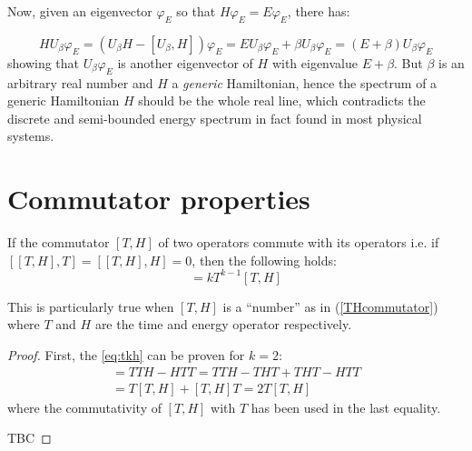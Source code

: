 \documentclass[a4paper,12pt]{article}
\begin{document}
Now, given an eigenvector $\varphi_{E}$ so that $H\varphi_{E}=E\varphi_{E}$, there has:

$$
HU_{\beta}\varphi_{E} = (U_{\beta}H - [U_{\beta}, H])\varphi_{E} =
EU_{\beta}\varphi_{E} + \beta U_{\beta}\varphi_{E} = (E+\beta)U_{\beta}\varphi_{E}
$$
showing that $U_{\beta}\varphi_{E}$ is another eigenvector of $H$ with eigenvalue
$E+\beta$. But $\beta$ is an arbitrary real number and $H$ a \emph{generic} Hamiltonian,
hence the spectrum of a generic Hamiltonian $H$ should
be the whole real line, which contradicts the discrete and semi-bounded energy spectrum
in fact found in most physical systems.

\appendix\section{Commutator properties}\label{CommProp}
\begin{lemma}
If the commutator $[T, H]$ of two operators commute with its operators i.e. if
$[[T, H], T] = [[T, H], H] = 0$, then the following holds:
\begin{equation}
[T^k, H] = kT^{k-1}[T, H]\label{eq:tkh}
\end{equation}
\end{lemma}
This is particularly true when $[T, H]$ is a ``number'' as in (\ref{THcommutator}) where
$T$ and $H$ are the time and energy operator respectively.
\begin{proof}
First, the \ref{eq:tkh} can be proven for $k=2$:
\begin{multline}
[T^2, H] = TTH - HTT = TTH - THT + THT - HTT \\ = T[T, H] + [T, H]T = 2T[T, H]  
\end{multline}
where the commutativity of $[T, H]$ with $T$ has been used in the last equality.

TBC
\end{proof}



\end{document}
